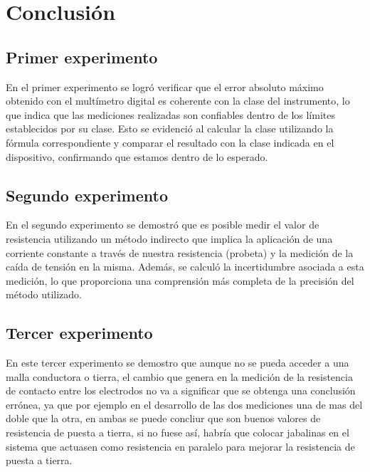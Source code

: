 \section{Conclusión}
\subsection{Primer experimento}
En el primer experimento se logró verificar que el error absoluto máximo obtenido con el multímetro digital es coherente con la clase del instrumento, lo que indica que las mediciones realizadas son confiables dentro de los límites establecidos por su clase. Esto se evidenció al calcular la clase utilizando la fórmula correspondiente y comparar el resultado con la clase indicada en el dispositivo, confirmando que estamos dentro de lo esperado.
\subsection{Segundo experimento}
En el segundo experimento se demostró que es posible medir el valor de resistencia utilizando un método indirecto que implica la aplicación de una corriente constante a través de nuestra resistencia (probeta) y la medición de la caída de tensión en la misma. Además, se calculó la incertidumbre asociada a esta medición, lo que proporciona una comprensión más completa de la precisión del método utilizado.
\subsection{Tercer experimento}
En este tercer experimento se demostro que aunque no se pueda acceder a una malla conductora o tierra, el cambio que genera en la medición de la resistencia de contacto entre los electrodos no va a significar que se obtenga una conclusión errónea, ya que por ejemplo en el desarrollo de las dos mediciones una de mas del doble que la otra, en ambas se puede concliur que son buenos valores de resistencia de puesta a tierra, si no fuese así, habría que colocar jabalinas en el sistema que actuasen como resistencia en paralelo para mejorar la resistencia de puesta a tierra. 